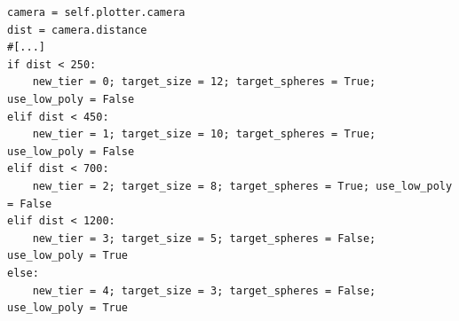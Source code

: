 \begin{lstlisting}[label={lst:visualize_lod}, caption={[LoD-Visualisierung]Dynamische LoD-Steuerung der Punktwolke}, breaklines=true, breakatwhitespace=true]
camera = self.plotter.camera
dist = camera.distance
#[...]
if dist < 250:
    new_tier = 0; target_size = 12; target_spheres = True; use_low_poly = False
elif dist < 450:
    new_tier = 1; target_size = 10; target_spheres = True; use_low_poly = False
elif dist < 700:
    new_tier = 2; target_size = 8; target_spheres = True; use_low_poly = False
elif dist < 1200:
    new_tier = 3; target_size = 5; target_spheres = False; use_low_poly = True
else:
    new_tier = 4; target_size = 3; target_spheres = False; use_low_poly = True
\end{lstlisting}